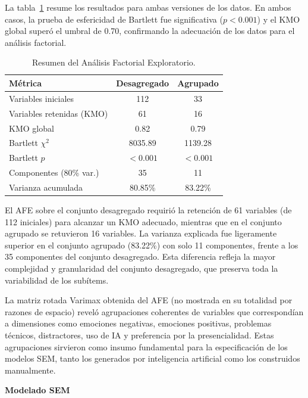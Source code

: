 \documentclass[conference]{IEEEtran}
\begin{document}
La tabla~\ref{tab:efa_resumen} resume los resultados para ambas versiones de los datos. En ambos casos, la prueba de esfericidad de Bartlett fue significativa ($p < 0.001$) y el KMO global superó el umbral de 0.70, confirmando la adecuación de los datos para el análisis factorial.

\begin{table}[!htb]
\centering
\footnotesize
\begin{tabular}{lcc}
\toprule
\textbf{Métrica} & \textbf{Desagregado} & \textbf{Agrupado} \\
\midrule
Variables iniciales & 112 & 33 \\
Variables retenidas (KMO) & 61 & 16 \\
KMO global & 0.82 & 0.79 \\
Bartlett $\chi^2$ & 8035.89 & 1139.28 \\
Bartlett $p$ & $<0.001$ & $<0.001$ \\
Componentes (80\% var.) & 35 & 11 \\
Varianza acumulada & 80.85\% & 83.22\% \\
\bottomrule
\end{tabular}
\caption{Resumen del Análisis Factorial Exploratorio.}
\label{tab:efa_resumen}
\end{table}

El AFE sobre el conjunto desagregado requirió la retención de 61 variables (de 112 iniciales) para alcanzar un KMO adecuado, mientras que en el conjunto agrupado se retuvieron 16 variables. La varianza explicada fue ligeramente superior en el conjunto agrupado (83.22\%) con solo 11 componentes, frente a los 35 componentes del conjunto desagregado. Esta diferencia refleja la mayor complejidad y granularidad del conjunto desagregado, que preserva toda la variabilidad de los subítems.

La matriz rotada Varimax obtenida del AFE (no mostrada en su totalidad por razones de espacio) reveló agrupaciones coherentes de variables que correspondían a dimensiones como emociones negativas, emociones positivas, problemas técnicos, distractores, uso de IA y preferencia por la presencialidad. Estas agrupaciones sirvieron como insumo fundamental para la especificación de los modelos SEM, tanto los generados por inteligencia artificial como los construidos manualmente.

\vspace{0.5em}
\noindent\textbf{Modelado SEM}
\end{document}

